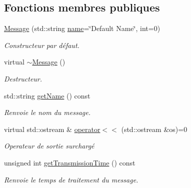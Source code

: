 \subsection*{Fonctions membres publiques}
\begin{DoxyCompactItemize}
\item 
\hypertarget{classMessage_a154809183fa5ec6b5182c487db1167dd}{\hyperlink{classMessage_a154809183fa5ec6b5182c487db1167dd}{Message} (std\-::string \hyperlink{classMessage_ac7adddb666acdc47c48f684bd6810a51}{name}=\char`\"{}Default Name\char`\"{}, int=0)}\label{classMessage_a154809183fa5ec6b5182c487db1167dd}

\begin{DoxyCompactList}\small\item\em Constructeur par défaut. \end{DoxyCompactList}\item 
\hypertarget{classMessage_a3f7275462831f787a861271687bcad67}{virtual \hyperlink{classMessage_a3f7275462831f787a861271687bcad67}{$\sim$\-Message} ()}\label{classMessage_a3f7275462831f787a861271687bcad67}

\begin{DoxyCompactList}\small\item\em Destructeur. \end{DoxyCompactList}\item 
\hypertarget{classMessage_a9134dbb49e75c4a4b8862afca70a78b9}{std\-::string \hyperlink{classMessage_a9134dbb49e75c4a4b8862afca70a78b9}{get\-Name} () const }\label{classMessage_a9134dbb49e75c4a4b8862afca70a78b9}

\begin{DoxyCompactList}\small\item\em Renvoie le nom du message. \end{DoxyCompactList}\item 
\hypertarget{classMessage_acbdab136245666bce3752fa311150672}{virtual std\-::ostream \& \hyperlink{classMessage_acbdab136245666bce3752fa311150672}{operator$<$$<$} (std\-::ostream \&os)=0}\label{classMessage_acbdab136245666bce3752fa311150672}

\begin{DoxyCompactList}\small\item\em Operateur de sortie surchargé \end{DoxyCompactList}\item 
\hypertarget{classMessage_a188f5472ff8a87568f649596a475e8b5}{unsigned int \hyperlink{classMessage_a188f5472ff8a87568f649596a475e8b5}{get\-Transmission\-Time} () const }\label{classMessage_a188f5472ff8a87568f649596a475e8b5}

\begin{DoxyCompactList}\small\item\em Renvoie le temps de traitement du message. \end{DoxyCompactList}\end{DoxyCompactItemize}
